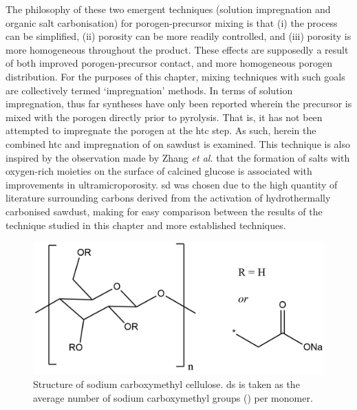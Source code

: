 The philosophy of these two emergent techniques (solution impregnation and organic salt carbonisation) for porogen-precursor mixing is that (i) the process can be simplified, (ii) porosity can be more readily controlled, and (iii) porosity is more homogeneous throughout the product. These effects are supposedly a result of both improved \gls{porogen}-precursor contact, and more homogeneous \gls{porogen} distribution. For the purposes of this chapter, mixing techniques with such goals are collectively termed `impregnation' methods. In terms of solution impregnation, thus far syntheses have only been reported wherein the precursor is mixed with the \gls{porogen} directly prior to pyrolysis.\citep{Botome2017Preparation, Ge2019Highly, Adlak2021Physicochemical, Shi2021Copper, Han2021Mulch, Boujibar2018CO2} That is, it has not been attempted to impregnate the \gls{porogen} at the \gls{htc} step. As such, herein the combined \gls{htc} and impregnation of  on sawdust is examined. This technique is also inspired by the observation made by Zhang \textit{et al.} that the formation of  salts with oxygen-rich moieties on the surface of calcined glucose is associated with improvements in ultramicroporosity.\citep{Zhang2019situ} \acrfull{sd} was chosen due to the high quantity of literature surrounding carbons derived from the activation of hydrothermally carbonised sawdust,\citep{Balahmar2019Pre, Aljumialy2020Porous, Cox2017Ultra, Balahmar2015Generalized} making for easy comparison between the results of the technique studied in this chapter and more established techniques.

\begin{figure}[b!]
    \centering
    \includegraphics[width=0.8\columnwidth]{4-impregnation/figs/nc_structure.png}
    \caption{Structure of sodium carboxymethyl cellulose. \Acrfull{ds} is taken as the average number of sodium carboxymethyl groups () per monomer.}
    \label{fig:nc_structure}
\end{figure}

